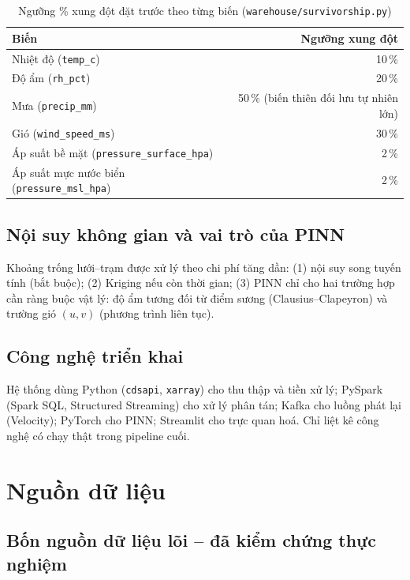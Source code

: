 \documentclass[12pt,a4paper]{report}
\begin{document}
\begin{table}[H]
\centering\small
\caption{Ngưỡng \% xung đột đặt trước theo từng biến (\texttt{warehouse/survivorship.py})}
\label{tab:conflict-threshold}
\begin{tabular}{@{}lr@{}}
\toprule
\textbf{Biến} & \textbf{Ngưỡng xung đột} \\
\midrule
Nhiệt độ (\texttt{temp\_c}) & 10\,\% \\
Độ ẩm (\texttt{rh\_pct}) & 20\,\% \\
Mưa (\texttt{precip\_mm}) & 50\,\% (biến thiên đối lưu tự nhiên lớn) \\
Gió (\texttt{wind\_speed\_ms}) & 30\,\% \\
Áp suất bề mặt (\texttt{pressure\_surface\_hpa}) & 2\,\% \\
Áp suất mực nước biển (\texttt{pressure\_msl\_hpa}) & 2\,\% \\
\bottomrule
\end{tabular}
\end{table}

\section{Nội suy không gian và vai trò của PINN}

Khoảng trống lưới--trạm được xử lý theo chi phí tăng dần: (1) nội suy song tuyến tính (bắt buộc);
(2) Kriging nếu còn thời gian; (3) PINN chỉ cho hai trường hợp cần ràng buộc vật lý: độ ẩm tương đối từ
điểm sương (Clausius--Clapeyron) và trường gió $(u,v)$ (phương trình liên tục).

\section{Công nghệ triển khai}

Hệ thống dùng Python (\texttt{cdsapi}, \texttt{xarray}) cho thu thập và tiền xử lý; PySpark (Spark SQL,
Structured Streaming) cho xử lý phân tán; Kafka cho luồng phát lại (Velocity); PyTorch cho PINN; Streamlit
cho trực quan hoá. Chỉ liệt kê công nghệ có chạy thật trong pipeline cuối.

\chapter{Nguồn dữ liệu}

\section{Bốn nguồn dữ liệu lõi -- đã kiểm chứng thực nghiệm}
\end{document}
